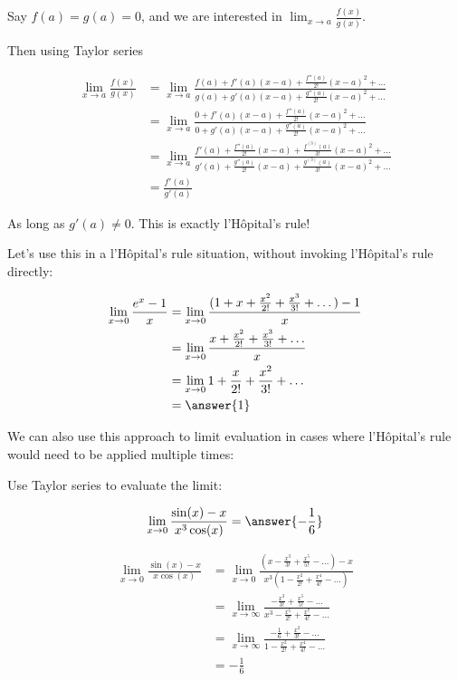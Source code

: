 \documentclass{ximera}
\begin{document}
Say $f(a) = g(a) = 0$, and we are interested in $\lim_{x \to a} \frac{f(x)}{g(x)}$.

Then using Taylor series

\begin{align*}
	\lim_{x \to a} \frac{f(x)}{g(x)} &= \lim_{x \to a} \frac{f(a)+f'(a)(x-a)+\frac{f''(a)}{2!}(x-a)^2+...}{g(a)+g'(a)(x-a)+\frac{g''(a)}{2!}(x-a)^2+...}\\
		&=  \lim_{x \to a} \frac{0+f'(a)(x-a)+\frac{f''(a)}{2!}(x-a)^2+...}{0+g'(a)(x-a)+\frac{g''(a)}{2!}(x-a)^2+...}\\
		&=  \lim_{x \to a} \frac{f'(a)+\frac{f''(a)}{2!}(x-a)+\frac{f^{(3)}(a)}{3!}(x-a)^2+...}{g'(a)+\frac{g''(a)}{2!}(x-a)+\frac{g^{(3)}(a)}{3!}(x-a)^2+...}\\
		&=\frac{f'(a)}{g'(a)}
\end{align*}

As long as $g'(a) \neq 0$.   This is exactly l'H\^{o}pital's rule!

Let's use this in a l'H\^{o}pital's rule situation, without invoking l'H\^{o}pital's rule directly:

\begin{example}
	
	\begin{align*}
	\lim_{x \to 0} \frac{e^x - 1}{x} &= \lim_{x \to 0} \frac{(1+x+\frac{x^2}{2!}+\frac{x^3}{3!}+\dots) - 1}{x}\\
		&= \lim_{x \to 0} \frac{x+\frac{x^2}{2!} +\frac{x^3}{3!}+\dots}{x}\\
		&=\lim_{x \to 0} 1+\frac{x}{2!}+\frac{x^2}{3!}+\dots\\
		&=\answer{1}
	\end{align*}
		
\end{example}

We can also use this approach to limit evaluation in cases where l'H\^{o}pital's rule would need to be applied multiple times:

\begin{question}
	Use Taylor series to evaluate the limit:
	
	\[
	\lim_{x \to 0} \frac{\sin(x)-x}{x^3\cos(x)} = \answer{-\frac{1}{6}}
	\]
	
	\begin{hint}
		\begin{align*}
			\lim_{x \to 0} \frac{\sin(x)-x}{x\cos(x)} &= \lim_{x \to 0} \frac{(x-\frac{x^3}{3!}+\frac{x^5}{5!}-\dots)-x}{x^3(1-\frac{x^2}{2!}+\frac{x^4}{4!}-\dots)}\\
				&= \lim_{x \to \infty} \frac{-\frac{x^3}{3!}+\frac{x^5}{5!}-\dots}{x^3 - \frac{x^5}{2!}+\frac{x^7}{4!}-\dots}\\
				&=\lim_{x \to \infty} \frac{-\frac{1}{6}+\frac{x^2}{3!}-\dots}{1-\frac{x^2}{2!}+\frac{x^4}{4!}-\dots}\\
				&=-\frac{1}{6}
		\end{align*}
	\end{hint}
\end{question}
\end{document}
